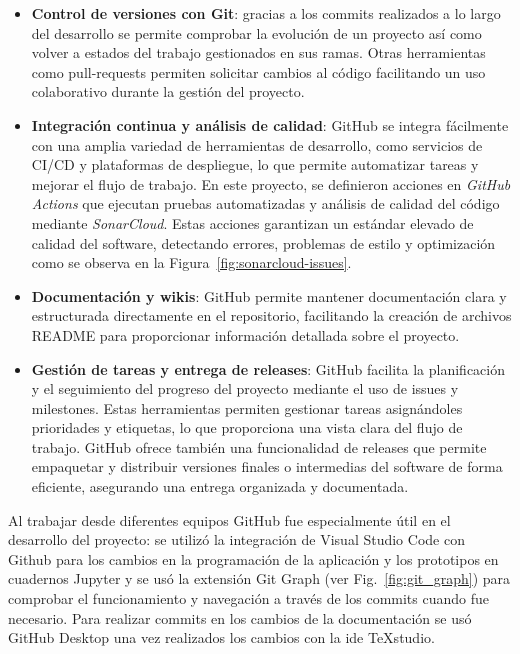	\begin{itemize}
		
		\item \textbf{Control de versiones con Git}: gracias a los commits realizados a lo largo del desarrollo se permite comprobar la evolución de un proyecto así como volver a estados del trabajo gestionados en sus ramas. Otras herramientas como pull-requests permiten solicitar cambios al código facilitando un uso colaborativo durante la gestión del proyecto.
		
		\item \textbf{Integración continua y análisis de calidad}: GitHub se integra fácilmente con una amplia variedad de herramientas de desarrollo, como servicios de CI/CD y plataformas de despliegue, lo que permite automatizar tareas y mejorar el flujo de trabajo. En este proyecto, se definieron acciones en \textit{GitHub Actions} que ejecutan pruebas automatizadas y análisis de calidad del código mediante \textit{SonarCloud}. Estas acciones garantizan un estándar elevado de calidad del software, detectando errores, problemas de estilo y optimización como se observa en la Figura~\ref{fig:sonarcloud-issues}. 
		
		\item \textbf{Documentación y wikis}: GitHub permite mantener documentación clara y estructurada directamente en el repositorio, facilitando la creación de archivos README para proporcionar información detallada sobre el proyecto.
		
		\item \textbf{Gestión de tareas y entrega de releases}: GitHub facilita la planificación y el seguimiento del progreso del proyecto mediante el uso de issues y milestones. Estas herramientas permiten gestionar tareas asignándoles prioridades y etiquetas, lo que proporciona una vista clara del flujo de trabajo. GitHub ofrece también una funcionalidad de releases que permite empaquetar y distribuir versiones finales o intermedias del software de forma eficiente, asegurando una entrega organizada y documentada.
		
		
	\end{itemize}
	Al trabajar desde diferentes equipos GitHub fue especialmente útil en el desarrollo del proyecto: se utilizó la integración de Visual Studio Code con Github para los cambios en la programación de la aplicación y los prototipos en cuadernos Jupyter y se usó la extensión Git Graph (ver Fig.~\ref{fig:git_graph}) para comprobar el funcionamiento y navegación a través de los commits cuando fue necesario. Para realizar commits en los cambios de la documentación se usó GitHub Desktop una vez realizados los cambios con la \acrshort{ide} TeXstudio.
	

